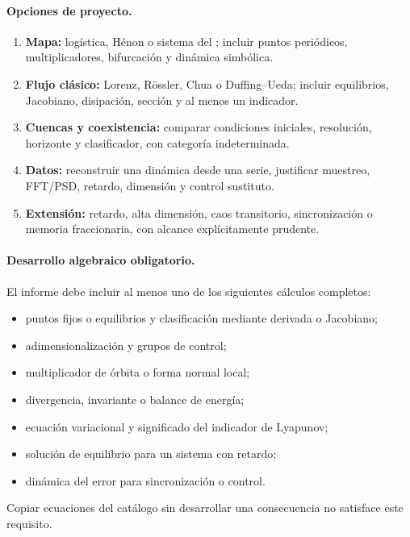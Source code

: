 \paragraph{Opciones de proyecto.}
\begin{enumerate}
  \item \textbf{Mapa:} logística, Hénon o sistema del ;
  incluir puntos periódicos, multiplicadores, bifurcación y dinámica simbólica.
  \item \textbf{Flujo clásico:} Lorenz, Rössler, Chua o Duffing--Ueda; incluir
  equilibrios, Jacobiano, disipación, sección y al menos un indicador.
  \item \textbf{Cuencas y coexistencia:} comparar condiciones iniciales, resolución,
  horizonte y clasificador, con categoría indeterminada.
  \item \textbf{Datos:} reconstruir una dinámica desde una serie, justificar muestreo,
  FFT/PSD, retardo, dimensión y control sustituto.
  \item \textbf{Extensión:} retardo, alta dimensión, caos transitorio,
  sincronización o memoria fraccionaria, con alcance explícitamente prudente.
\end{enumerate}

\paragraph{Desarrollo algebraico obligatorio.}
El informe debe incluir al menos uno de los siguientes cálculos completos:
\begin{itemize}
  \item puntos fijos o equilibrios y clasificación mediante derivada o Jacobiano;
  \item adimensionalización y grupos de control;
  \item multiplicador de órbita o forma normal local;
  \item divergencia, invariante o balance de energía;
  \item ecuación variacional y significado del indicador de Lyapunov;
  \item solución de equilibrio para un sistema con retardo;
  \item dinámica del error para sincronización o control.
\end{itemize}
Copiar ecuaciones del catálogo sin desarrollar una consecuencia no satisface este
requisito.

